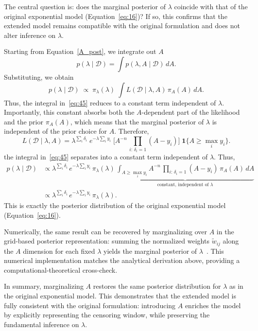 The central question is: does the marginal posterior of $\lambda$ coincide with that of the original exponential model (Equation~\ref{eq:16})? If so, this confirms that the extended model remains compatible with the original formulation and does not alter inference on $\lambda$.

Starting from Equation~\eqref{A_post}, we integrate out $A$~\cite{berger1999integrated}
\begin{equation}
    p(\lambda \mid \mathcal D)
= \int p(\lambda, A \mid \mathcal D)\,dA.
\end{equation}
Substituting, we obtain
\begin{equation}
    p(\lambda \mid \mathcal D)\;\propto\;\pi_\lambda(\lambda)\;\int L(\mathcal D \mid \lambda, A)\,\pi_A(A)\,dA.
    \label{eq:45}
\end{equation}
Thus, the integral in~\eqref{eq:45} reduces to a constant term independent of $\lambda$. 
Importantly, this constant absorbs both the $A$-dependent part of the likelihood and the prior $\pi_A(A)$, which means that the marginal posterior of $\lambda$ is independent of the prior choice for $A$. 
Therefore,
\begin{equation}
    L(\mathcal D \mid \lambda, A)
= \lambda^{\sum_i \delta_i}\;
e^{-\lambda \sum_i y_i}\;
\Bigg[
A^{-n}\,\prod_{i:\,\delta_i=1}(A-y_i)
\Bigg]\;\mathbf 1\{A \ge \max_i y_i\}.
\end{equation}
the integral in~\eqref{eq:45} separates into a constant term independent of $\lambda$. Thus,
\begin{align}
\label{eq:47}
p(\lambda \mid \mathcal{D})
&\propto \lambda^{\sum_i \delta_i}\,
e^{-\lambda \sum_i y_i}\,
\pi_\lambda(\lambda)\,
\underbrace{\int_{A \ge \max_i y_i}
A^{-n}\,\prod_{i:\,\delta_i=1}(A-y_i)\,\pi_A(A)\,dA}_{\text{constant, independent of }\lambda} \\[2pt]
&\propto \lambda^{\sum_i \delta_i}\, e^{-\lambda \sum_i y_i}\, \pi_{\lambda}(\lambda).
\end{align}
This is exactly the posterior distribution of the original exponential model (Equation~\ref{eq:16}).  

Numerically, the same result can be recovered by marginalizing over $A$ in the grid-based posterior representation: summing the normalized weights $\tilde w_{ij}$ along the $A$ dimension for each fixed $\lambda$ yields the marginal posterior of $\lambda$~\cite{ORMEROD201145, cowles2009reparameterized}. This numerical implementation matches the analytical derivation above, providing a computational-theoretical cross-check.

In summary, marginalizing $A$ restores the same posterior distribution for $\lambda$ as in the original exponential model. This demonstrates that the extended model is fully consistent with the original formulation: introducing $A$ enriches the model by explicitly representing the censoring window, while preserving the fundamental inference on $\lambda$.